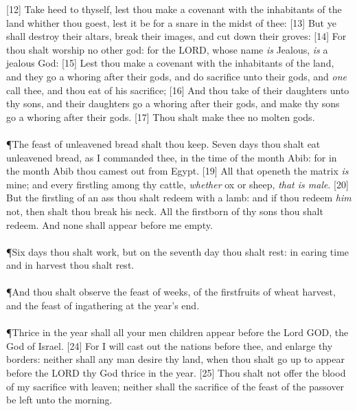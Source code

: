[12] \textcolor[rgb]{0.00,0.00,1.00}{Take heed to thyself, lest thou make a covenant with the inhabitants of the land whither thou goest, lest it be for a snare in the midst of thee:}
[13] \textcolor[rgb]{0.00,0.00,1.00}{But ye shall destroy their altars, break their images, and cut down their groves:}
[14] \textcolor[rgb]{0.00,0.00,1.00}{For thou shalt worship no other god: for the LORD, whose name \emph{is} Jealous, \emph{is} a jealous God:}
[15] \textcolor[rgb]{0.00,0.00,1.00}{Lest thou make a covenant with the inhabitants of the land, and they go a whoring after their gods, and do sacrifice unto their gods, and \emph{one} call thee, and thou eat of his sacrifice;}
[16] \textcolor[rgb]{0.00,0.00,1.00}{And thou take of their daughters unto thy sons, and their daughters go a whoring after their gods, and make thy sons go a whoring after their gods.}
[17] \textcolor[rgb]{0.00,0.00,1.00}{Thou shalt make thee no molten gods.}\\
\\
\P \textcolor[rgb]{0.00,0.00,1.00}{The feast of unleavened bread shalt thou keep. Seven days thou shalt eat unleavened bread, as I commanded thee, in the time of the month Abib: for in the month Abib thou camest out from Egypt.}
[19] \textcolor[rgb]{0.00,0.00,1.00}{All that openeth the matrix \emph{is} mine; and every firstling among thy cattle, \emph{whether} ox or sheep, \emph{that is male}.}
[20] \textcolor[rgb]{0.00,0.00,1.00}{But the firstling of an ass thou shalt redeem with a lamb: and if thou redeem \emph{him} not, then shalt thou break his neck. All the firstborn of thy sons thou shalt redeem. And none shall appear before me empty.}\\
\\
\P \textcolor[rgb]{0.00,0.00,1.00}{Six days thou shalt work, but on the seventh day thou shalt rest: in earing time and in harvest thou shalt rest.}\\
\\
\P \textcolor[rgb]{0.00,0.00,1.00}{And thou shalt observe the feast of weeks, of the firstfruits of wheat harvest, and the feast of ingathering at the year's end.}\\
\\
\P \textcolor[rgb]{0.00,0.00,1.00}{Thrice in the year shall all your men children appear before the Lord GOD, the God of Israel.}
[24] \textcolor[rgb]{0.00,0.00,1.00}{For I will cast out the nations before thee, and enlarge thy borders: neither shall any man desire thy land, when thou shalt go up to appear before the LORD thy God thrice in the year.}
[25] \textcolor[rgb]{0.00,0.00,1.00}{Thou shalt not offer the blood of my sacrifice with leaven; neither shall the sacrifice of the feast of the passover be left unto the morning.}

